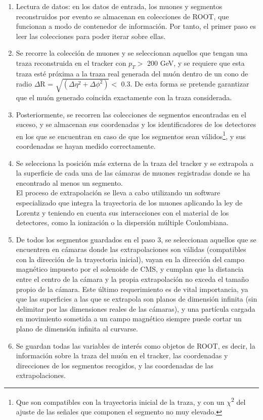 \begin{enumerate}

\item Lectura de datos: en los datos de entrada, los muones y segmentos reconstruidos por evento se almacenan en colecciones de ROOT, que funcionan a modo de contenedor de informaci\'on. Por tanto, el primer paso es leer las colecciones para poder iterar sobre ellas. 

\item Se recorre la colecci\'on de muones y se seleccionan aquellos que tengan una traza reconstruida en el tracker con $p_{T} >$ 200 GeV, y se requiere que esta traza est\'e pr\'oxima a la traza real generada del mu\'on dentro de un cono de radio $\Delta$R = $\sqrt{(\Delta\eta^{2}+\Delta\phi^{2})} <$  0.3. De esta forma se pretende garantizar que el mu\'on generado coincida exactamente con la traza considerada.

\item Posteriormente, se recorren las colecciones de segmentos encontradas en el suceso, y se almacenan sus coordenadas y los identificadores de los detectores en los que se encuentran en caso de que los segmentos sean v\'alidos\footnote{Que son compatibles con la trayectoria inicial de la traza, y con un $\chi$\textsuperscript{2} del ajuste de las se\~nales que componen el segmento no muy elevado.}, y sus coordenadas se hayan medido correctamente.

\item Se selecciona la posici\'on m\'as externa de la traza del tracker y se extrapola a la superficie de cada una de las c\'amaras de muones registradas donde se ha encontrado al menos un segmento. \\
El proceso de extrapolaci\'on se lleva a cabo utilizando un software especializado que integra la trayectoria de los muones aplicando la ley de Lorentz y teniendo en cuenta sus interacciones con el material de los detectores, como la ionizaci\'on o la dispersi\'on m\'ultiple Coulombiana.

\item De todos los segmentos guardados en el paso 3, se seleccionan aquellos que se encuentren en c\'amaras donde las extrapolaciones son v\'alidas (compatibles con la direcci\'on de la trayectoria inicial), vayan en la direcci\'on del campo magn\'etico impuesto por el solenoide de CMS, y cumplan que la distancia entre el centro de la c\'amara y la propia extrapolaci\'on no exceda el tama\~no propio de la c\'amara. Este \'ultimo requerimiento es de vital importancia, ya que las superficies a las que se extrapola son planos de dimensi\'on infinita (sin delimitar por las dimensiones reales de las c\'amaras), y una part\'icula cargada en movimiento sometida a un campo magn\'etico siempre puede cortar un plano de dimensi\'on infinita al curvarse.

\item Se guardan todas las variables de inter\'es como objetos de ROOT, es decir, la informaci\'on sobre la traza del mu\'on en el tracker, las coordenadas y direcciones de los segmentos recogidos, y las coordenadas de las extrapolaciones.
\end{enumerate}


